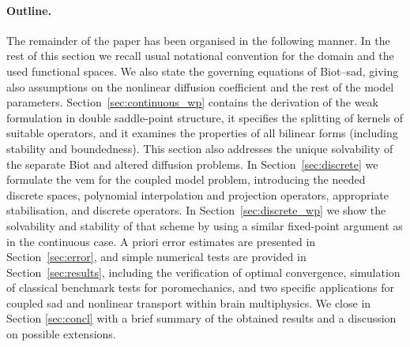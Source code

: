 \documentclass[fleqn,a4paper]{cas-sc}
\newcommand{\0}{\boldsymbol{0}}
\numberwithin{equation}{section}
\numberwithin{figure}{section}
\begin{document}
\paragraph{Outline.} The remainder of the paper has been organised in the following manner. In the rest of this section we recall usual notational convention for the domain and the used functional spaces. We also state the governing equations of Biot--\gls{sad}, giving also assumptions on the nonlinear diffusion coefficient and the rest of the model parameters. Section~\ref{sec:continuous_wp} contains the derivation of the weak formulation in double saddle-point structure, it specifies the splitting of kernels of suitable operators, and it examines the properties of all bilinear forms (including stability and boundedness). This section also addresses the unique solvability of the separate Biot and altered diffusion problems. In Section~\ref{sec:discrete} we formulate the \gls{vem} for the coupled model problem, introducing the needed discrete spaces, polynomial interpolation and projection operators, appropriate stabilisation, and discrete operators. In Section~\ref{sec:discrete_wp} we show the solvability and stability of that scheme by using a similar fixed-point argument as in the continuous case. A priori error estimates are presented in Section~\ref{sec:error}, and simple numerical tests are provided in Section~\ref{sec:results}, including the verification of optimal convergence, simulation of classical benchmark tests for poromechanics, and {two specific applications} for coupled \gls{sad} and nonlinear transport within brain multiphysics. {We close in Section \ref{sec:concl} with a brief summary of the obtained results and a discussion on possible extensions.}
\end{document}
